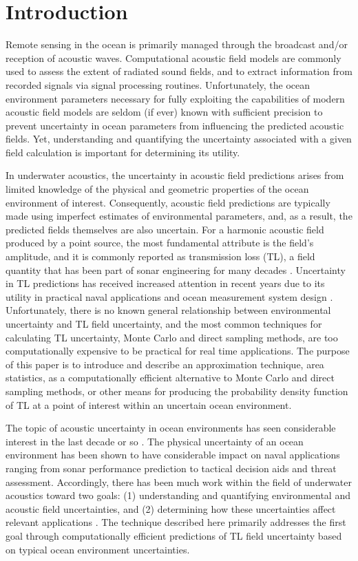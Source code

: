 \section{Introduction} \label{section:asuq_astats_intro}
Remote sensing in the ocean is primarily managed through the broadcast
and/or reception of acoustic waves. Computational acoustic field
models are commonly used to assess the extent of radiated sound
fields, and to extract information from recorded signals via signal
processing routines. Unfortunately, the ocean environment parameters
necessary for fully exploiting the capabilities of modern acoustic
field models are seldom (if ever) known with sufficient precision to
prevent uncertainty in ocean parameters from influencing the predicted
acoustic fields. Yet, understanding and quantifying the uncertainty
associated with a given field calculation is important for determining
its utility.

In underwater acoustics, the uncertainty in acoustic field predictions
arises from limited knowledge of the physical and geometric properties
of the ocean environment of interest. Consequently, acoustic field
predictions are typically made using imperfect estimates of
environmental parameters, and, as a result, the predicted fields
themselves are also uncertain. For a harmonic acoustic field produced
by a point source, the most fundamental attribute is the field's
amplitude, and it is commonly reported as transmission loss (TL), a
field quantity that has been part of sonar engineering for many
decades \citep{Urick1962}. Uncertainty in TL predictions has received
increased attention in recent years due to its utility in practical
naval applications \citep{Abbot2002,Pace2002} and ocean measurement
system design \citep{Munk1994}.  Unfortunately, there is no known
general relationship between environmental uncertainty and TL field
uncertainty, and the most common techniques for calculating TL
uncertainty, Monte Carlo and direct sampling methods, are too
computationally expensive to be practical for real time
applications. The purpose of this paper is to introduce and describe
an approximation technique, area statistics, as a computationally
efficient alternative to Monte Carlo and direct sampling methods, or
other means for producing the probability density function of TL at a
point of interest within an uncertain ocean environment.

The topic of acoustic uncertainty in ocean environments has seen
considerable interest in the last decade or so
\citep{Livingston2006}. The physical uncertainty of an ocean
environment has been shown to have considerable impact on naval
applications ranging from sonar performance prediction to tactical
decision aids and threat assessment. Accordingly, there has been much
work within the field of underwater acoustics toward two goals: (1)
understanding and quantifying environmental and acoustic field
uncertainties, and (2) determining how these uncertainties affect
relevant applications
\citep{Abbot2002,Emerson2014,Sha2005,Stone2004}. The technique
described here primarily addresses the first goal through
computationally efficient predictions of TL field uncertainty based on
typical ocean environment uncertainties.

